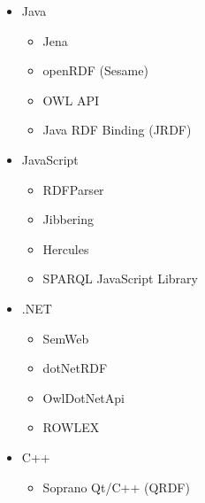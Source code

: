 \documentclass[xcolor=dvipsnames]{beamer}
\begin{document}
\begin{frame}[plain]
\begin{columns}

\begin{itemize}
	\item Java
		\begin{itemize}
			\item 	Jena
			\item openRDF (Sesame)
			\item OWL API
			\item Java RDF Binding (JRDF)
		\end{itemize}
	\item JavaScript
		\begin{itemize}
			\item RDFParser 
			\item Jibbering
			\item Hercules
			\item SPARQL JavaScript Library  
		\end{itemize}
	\item .NET
		\begin{itemize}
			\item SemWeb
			\item dotNetRDF
			\item OwlDotNetApi
			\item ROWLEX
		\end{itemize}
	\item C++
		\begin{itemize}
			\item Soprano  Qt/C++ (QRDF)
		\end{itemize}
\end{itemize}



\end{columns}
\end{frame}
\end{document}
